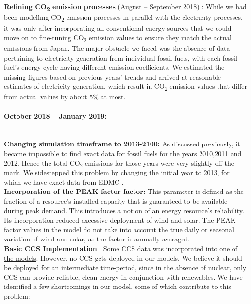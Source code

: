 \documentclass[14pt,a4paper]{article} %
\begin{document}
\textbf{Refining CO\textsubscript{2} emission processes} (August – September 2018) : While we had been modelling CO\textsubscript{2} emission processes in parallel with the electricity processes, it was only after incorporating all conventional energy sources that we could move on to fine-tuning CO\textsubscript{2} emission values to ensure they match the actual emissions from Japan. The major obstacle we faced was the absence of data pertaining to electricity generation from individual fossil fuels, with each fossil fuel's energy cycle having different emission coefficients. We estimated the missing figures based on previous years' trends \cite{noauthor_energy_2018,noauthor_national_2018} and arrived at reasonable estimates of electricity generation, which result in CO\textsubscript{2} emission values that differ from actual values by about 5\% at most.\\

\paragraph{October 2018 – January 2019:} ~ \\

\textbf{Changing simulation timeframe to 2013-2100:} As discussed previously, it became impossible to find exact data for fossil fuels for the years 2010,2011 and 2012. Hence the total CO$_2$ emissions for those years were very slightly off the mark. We sidestepped this problem by changing the initial year to 2013, for which we have exact data from \gls{EDMC} \cite{noauthor_energy_2018}.\\

\textbf{Incorporation of the \gls{PEAK} factor \cite{gargiulo_documentation_2005} factor:} This parameter is defined as the fraction of a resource's installed  capacity that is guaranteed to be available during peak demand. This introduces a notion of an energy resource's reliability. Its incorporation reduced excessive deployment of wind and solar. The \gls{PEAK} factor values in the model \cite{kato_energy_2016} do not take into account the true daily or seasonal variation of wind and solar, as the factor is annually averaged.\\

\textbf{Basic \gls{CCS} Implementation} : Some \gls{CCS} data \cite{kato_energy_2016}  was incorporated into \href{https://github.com/arfc/i2cner/tree/master/JPN-Main-Model/active/i2cner-nonuc}{one of the models}. However, no \gls{CCS} gets deployed in our models. We believe  it should be deployed for an intermediate time-period, since in the absence of nuclear, only \gls{CCS} can provide reliable, clean energy in conjunction with renewables. We have identified a few shortcomings in our model, some of which contribute to this problem:
\end{document}
